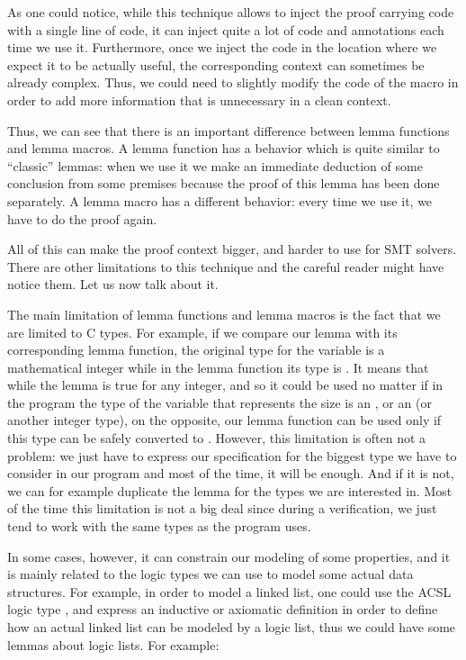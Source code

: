 As one could notice, while this technique allows to inject the proof carrying
code with a single line of code, it can inject quite a lot of code and
annotations each time we use it. Furthermore, once we inject the code in the
location where we expect it to be actually useful, the corresponding context
can sometimes be already complex. Thus, we could need to slightly modify the
code of the macro in order to add more information that is unnecessary in a
clean context.


Thus, we can see that there is an important difference between lemma functions
and lemma macros. A lemma function has a behavior which is quite similar to
``classic'' lemmas: when we use it we make an immediate deduction of some
conclusion from some premises because the proof of this lemma has been done
separately. A lemma macro has a different behavior: every time we use it,
we have to do the proof again.


All of this can make the proof context bigger, and harder to use for SMT solvers.
There are other limitations to this technique and the careful reader might have
notice them. Let us now talk about it.






The main limitation of lemma functions and lemma macros is the fact that we are
limited to C types. For example, if we compare our lemma
 with its corresponding lemma
function, the original type for the variable  is a mathematical
integer while in the lemma function its type is . It means
that while the lemma is true for any integer, and so it could be used no matter
if in the program the type of the variable that represents the size is an
, or an  (or another integer type), on the
opposite, our lemma function can be used only if this type can be safely
converted to . However, this limitation is often not a
problem: we just have to express our specification for the biggest type we have
to consider in our program and most of the time, it will be enough. And if it is
not, we can for example duplicate the lemma for the types we are interested in.
Most of the time this limitation is not a big deal since during a
verification, we just tend to work with the same types as the program uses.



In some cases, however, it can constrain our modeling of some properties, and
it is mainly related to the logic types we can use to model some actual data
structures. For example, in order to model a linked list, one could use the
ACSL logic type , and express an
inductive or axiomatic definition in order to define how an actual linked list
can be modeled by a logic list, thus we could have some lemmas about logic
lists. For example:

